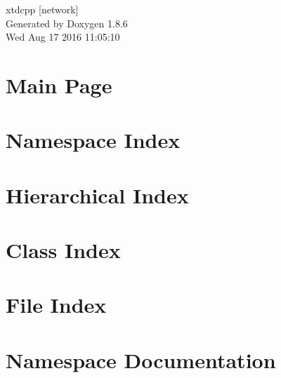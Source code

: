 \documentclass[twoside]{book}
\newcommand{\clearemptydoublepage}{%
  \newpage{\pagestyle{empty}\cleardoublepage}%
}
\begin{document}
\hypersetup{pageanchor=false}
\begin{titlepage}
\vspace*{7cm}
\begin{center}%
{\Large xtdcpp \mbox{[}network\mbox{]} }\\
\vspace*{1cm}
{\large Generated by Doxygen 1.8.6}\\
\vspace*{0.5cm}
{\small Wed Aug 17 2016 11:05:10}\\
\end{center}
\end{titlepage}
\clearemptydoublepage
\tableofcontents
\clearemptydoublepage
{}
\hypersetup{pageanchor=true}

\chapter{Main Page}
\label{index}\hypertarget{index}{}
\chapter{Namespace Index}

\chapter{Hierarchical Index}

\chapter{Class Index}

\chapter{File Index}

\chapter{Namespace Documentation}








\end{document}
